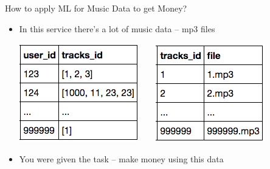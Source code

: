 \documentclass{beamer}
\begin{document}
\begin{frame}{How to apply ML for Music Data to get Money?}
\begin{itemize}
\begin{center}
		\end{center}
		 \item In this service there's a lot of music data -- mp3 files
			\begin{center}
			\includegraphics[scale=0.4]{img/u2t}~~~~\includegraphics[scale=0.4]{img/t2f} 
			\end{center}
		 \item You were given the task -- make money using this data
	\end{itemize}
\end{frame}
\end{document}
